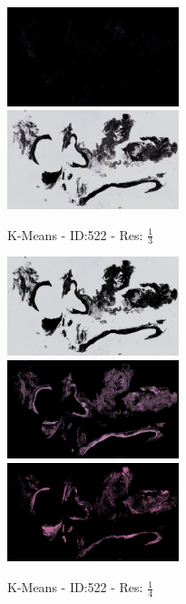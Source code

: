 \documentclass[letterpaper,10pt,oneside]{article}
\begin{document}
\begin{figure}[hbtp]
  \begin{subfigure}[b]{5cm}
    \includegraphics[width=5cm]{visualization/results/kmeans/res_reduce_3/Region_0_PO13-00522A1_1_2_201305171639.png}
    \includegraphics[width=5cm]{visualization/results/kmeans/res_reduce_3/Region_2_PO13-00522A1_1_2_201305171639.png}
    \caption{K-Means - ID:522 - Res: $\frac{1}{3}$}
  \end{subfigure}
  \begin{subfigure}[b]{5cm}
    \includegraphics[width=5cm]{visualization/results/kmeans/res_reduce_4/Region_0_PO13-00522A1_1_2_201305171639.png}
    \includegraphics[width=5cm]{visualization/results/kmeans/res_reduce_4/Region_1_PO13-00522A1_1_2_201305171639.png}
    \includegraphics[width=5cm]{visualization/results/kmeans/res_reduce_4/Region_2_PO13-00522A1_1_2_201305171639.png}
    \caption{K-Means - ID:522 - Res: $\frac{1}{4}$}
  \end{subfigure}
  \begin{subfigure}[b]{5cm}

\end{subfigure}
\end{figure}
\end{document}
